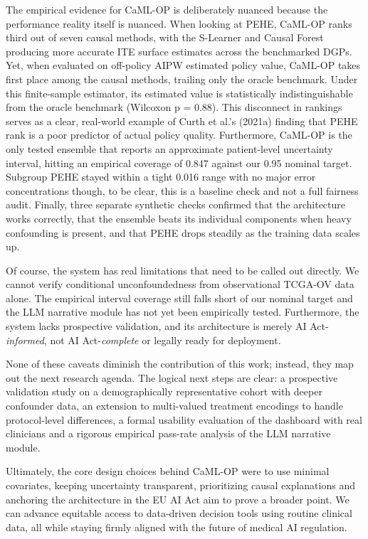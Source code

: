 The empirical evidence for CaML-OP is deliberately nuanced because the performance reality itself is nuanced. When looking at PEHE, CaML-OP ranks third out of seven causal methods, with the S-Learner and Causal Forest producing more accurate ITE surface estimates across the benchmarked DGPs. Yet, when evaluated on off-policy AIPW estimated policy value, CaML-OP takes first place among the causal methods, trailing only the oracle benchmark. Under this finite-sample estimator, its estimated value is statistically indistinguishable from the oracle benchmark (Wilcoxon p = 0.88). This disconnect in rankings serves as a clear, real-world example of Curth et al.'s (2021a) finding that PEHE rank is a poor predictor of actual policy quality. Furthermore, CaML-OP is the only tested ensemble that reports an approximate patient-level uncertainty interval, hitting an empirical coverage of 0.847 against our 0.95 nominal target. Subgroup PEHE stayed within a tight 0.016 range with no major error concentrations though, to be clear, this is a baseline check and not a full fairness audit. Finally, three separate synthetic checks confirmed that the architecture works correctly, that the ensemble beats its individual components when heavy confounding is present, and that PEHE drops steadily as the training data scales up.

Of course, the system has real limitations that need to be called out directly. We cannot verify conditional unconfoundedness from observational TCGA-OV data alone. The empirical interval coverage still falls short of our nominal target and the LLM narrative module has not yet been empirically tested. Furthermore, the system lacks prospective validation, and its architecture is merely AI Act-\emph{informed}, not AI Act-\emph{complete} or legally ready for deployment.

None of these caveats diminish the contribution of this work; instead, they map out the next research agenda. The logical next steps are clear: a prospective validation study on a demographically representative cohort with deeper confounder data, an extension to multi-valued treatment encodings to handle protocol-level differences, a formal usability evaluation of the dashboard with real clinicians and a rigorous empirical pass-rate analysis of the LLM narrative module.

Ultimately, the core design choices behind CaML-OP were to use minimal covariates, keeping uncertainty transparent, prioritizing causal explanations and anchoring the architecture in the EU AI Act aim to prove a broader point. We can advance equitable access to data-driven decision tools using routine clinical data, all while staying firmly aligned with the future of medical AI regulation.

